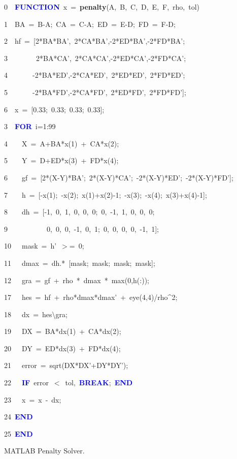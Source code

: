 \documentclass[times,12pt]{article}
\begin{document}
\begin{algorithm}
0~~\textbf{\textcolor{blue}{FUNCTION}}~x~=~\textbf{penalty}(A,~B,~C,~D,~E,~F,~rho,~tol)

1~~BA~=~B-A;~CA~=~C-A;~ED~=~E-D;~FD~=~F-D;

2~~hf~=~{[}2{*}BA{*}BA',~2{*}CA{*}BA',-2{*}ED{*}BA',-2{*}FD{*}BA';

3~~~~~~~~2{*}BA{*}CA',~2{*}CA{*}CA',-2{*}ED{*}CA',-2{*}FD{*}CA';

4~~~~~~~-2{*}BA{*}ED',-2{*}CA{*}ED',~2{*}ED{*}ED',~2{*}FD{*}ED';

5~~~~~~~-2{*}BA{*}FD',-2{*}CA{*}FD',~2{*}ED{*}FD',~2{*}FD{*}FD'{]};

6~~x~=~{[}0.33;~0.33;~0.33;~0.33{]};

3~~\textbf{\textcolor{blue}{FOR}}~i=1:99

4~~~~X~=~A+BA{*}x(1)~+~CA{*}x(2);

5~~~~Y~=~D+ED{*}x(3)~+~FD{*}x(4);

6~~~~gf~=~{[}2{*}(X-Y){*}BA';~2{*}(X-Y){*}CA';~-2{*}(X-Y){*}ED';~-2{*}(X-Y){*}FD'{]};~

7~~~~h~=~{[}-x(1);~-x(2);~x(1)+x(2)-1;~-x(3);~-x(4);~x(3)+x(4)-1{]};

8~~~~dh~=~{[}-1,~0,~1,~0,~0,~0;~0,~-1,~1,~0,~0,~0;

9~~~~~~~~~~~0,~0,~0,~-1,~0,~1;~0,~0,~0,~0,~-1,~1{]};

10~~~mask~=~h'~$>$=~0;

11~~~dmax~=~dh.{*}~{[}mask;~mask;~mask;~mask{]};

12~~~gra~=~gf~+~rho~{*}~dmax~{*}~max(0,h(:));

17~~~hes~=~hf~+~rho{*}dmax{*}dmax'~+~eye(4,4)/rho\textasciicircum{}2;

18~~~dx~=~hes\textbackslash{}gra;

19~~~DX~=~BA{*}dx(1)~+~CA{*}dx(2);

20~~~DY~=~ED{*}dx(3)~+~FD{*}dx(4);

21~~~error~=~sqrt(DX{*}DX'+DY{*}DY');

22~~~\textbf{\textcolor{blue}{IF}}~error~$<$~tol,~\textbf{\textcolor{blue}{BREAK}};~\textbf{\textcolor{blue}{END}}

23~~~x~=~x~-~dx;

24~\textbf{\textcolor{blue}{END}}

25~\textbf{\textcolor{blue}{END}}
\protect\caption{\label{alg4}MATLAB Penalty Solver.}
\end{algorithm}
\end{document}
